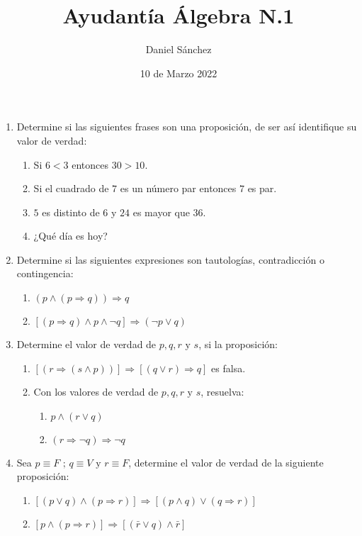 \documentclass[12pt]{article}
\begin{document}
\title{Ayudant\'ia \'Algebra N.1}
\date{10 de Marzo 2022}
\author{Daniel S\'anchez}
\maketitle

\begin{enumerate}
    \item Determine si las siguientes frases son una proposici\'on, de ser
          as\'i identifique su valor de verdad:
          \begin{enumerate}
              \item Si $6<3$ entonces $30>10$.
              \item Si el cuadrado de $7$ es un n\'umero par entonces $7$ es par.
              \item $5$ es distinto de $6$ y $24$ es mayor que $36$.
              \item ¿Qu\'e d\'ia es hoy?
          \end{enumerate}
    \item Determine si las siguientes expresiones son tautolog\'ias, contradicci\'on
          o contingencia:
          \begin{enumerate}
              \item $(p \land (p \Rightarrow q)) \Rightarrow q$
              \item $[(p \Rightarrow q) \land p \land \lnot q] \Rightarrow (\lnot p \lor q)$
          \end{enumerate}
    \item Determine el valor de verdad de $p, q, r\mbox{ y } s$, si la proposici\'on:
          \begin{enumerate}
              \item $[(r \Rightarrow (s \land p))]\Rightarrow [(q \lor r) \Rightarrow q]$ es falsa.
              \item Con los valores de verdad de $p, q, r \mbox{ y } s$, resuelva:
                    \begin{enumerate}
                        \item $p \land (r \lor q)$
                        \item $(r \Rightarrow \lnot q) \Rightarrow \lnot q$
                    \end{enumerate}
          \end{enumerate}
    \item Sea $p \equiv F \mbox{ ; } q \equiv V \mbox{ y } r \equiv F$, determine el valor de verdad de la siguiente proposici\'on:
          \begin{enumerate}
              \item $[(p \lor q) \land (p \Rightarrow r)] \Rightarrow [(p \land q)\lor(q \Rightarrow r)]$
              \item $[p \land (p \Rightarrow r)] \Rightarrow [(\bar{r} \lor q)\land \bar{r}]$
          \end{enumerate}
\end{enumerate}
\end{document}
